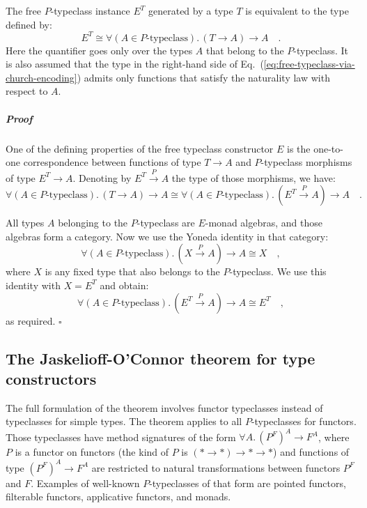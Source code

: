 The free $P$-typeclass instance $E^{T}$ generated by a type $T$
is equivalent to the type defined by:
\begin{equation}
E^{T}\cong\forall(A\in P\text{-typeclass}).\,(T\rightarrow A)\rightarrow A\quad.\label{eq:free-typeclass-via-church-encoding}
\end{equation}
Here the quantifier goes only over the types $A$ that belong to the
$P$-typeclass. It is also assumed that the type in the right-hand
side of Eq.~(\ref{eq:free-typeclass-via-church-encoding}) admits
only functions that satisfy the naturality law with respect to $A$.

\subparagraph{Proof}

One of the defining properties of the free typeclass constructor $E$
is the one-to-one correspondence between functions of type $T\rightarrow A$
and $P$-typeclass morphisms of type $E^{T}\rightarrow A$. Denoting
by $E^{T}\overset{P}{\rightarrow}A$ the type of those morphisms,
we have:
\[
\forall(A\in P\text{-typeclass}).\,(T\rightarrow A)\rightarrow A\cong\forall(A\in P\text{-typeclass}).\,(E^{T}\overset{P}{\rightarrow}A)\rightarrow A\quad.
\]

All types $A$ belonging to the $P$-typeclass are $E$-monad algebras,
and those algebras form a category. Now we use the Yoneda identity
in that category:
\[
\forall(A\in P\text{-typeclass}).\,(X\overset{P}{\rightarrow}A)\rightarrow A\cong X\quad,
\]
where $X$ is any fixed type that also belongs to the $P$-typeclass.
We use this identity with $X=E^{T}$ and obtain:
\[
\forall(A\in P\text{-typeclass}).\,(E^{T}\overset{P}{\rightarrow}A)\rightarrow A\cong E^{T}\quad,
\]
as required. $\square$

\subsection{The Jaskelioff-O\textsf{'}Connor theorem for type constructors}

The full formulation of the theorem involves functor typeclasses instead
of typeclasses for simple types. The theorem applies to all $P$-typeclasses
for functors. Those typeclasses have method signatures of the form
$\forall A.\,(P^{F})^{A}\rightarrow F^{A}$, where $P$ is a functor
on functors (the kind of $P$ is $(*\rightarrow*)\rightarrow*\rightarrow*$)
and functions of type $(P^{F})^{A}\rightarrow F^{A}$ are restricted
to natural transformations between functors $P^{F}$ and $F$. Examples
of well-known $P$-typeclasses of that form are pointed functors,
filterable functors, applicative functors, and monads.

